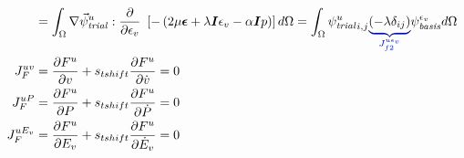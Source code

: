 \begin{align}
                                                                                                                                    & = \int_{\Omega} \nabla \trialvec[u] : \frac{\partial}{\partial \epsilon_{v}} \
    \left[-\left(2 \mu \tensor{\epsilon} + \lambda \tensor{I} \epsilon_{v} - \alpha \tensor{I} p \right) \right] d\Omega =
    \int_{\Omega} \trialscalar[u]_{i,j} \eqnannotate{\left(-\lambda \delta_{ij} \right)}{J_{f2}^{u \epsilon_{v}}} \basisscalar[\epsilon_{v}] d\Omega                                                                                                                                  \\
    J_F^{uv}                                                                                                                        & = \frac{\partial F^u}{\partial v} + s_{tshift} \frac{\partial F^u}{\partial \dot{v}} = 0                                                        \\
    J_F^{u P}                                                                                                                       & = \frac{\partial F^u}{\partial P} + s_{tshift} \frac{\partial F^u}{\partial \dot{P}} = 0                                                        \\
    J_F^{u E_{v}}                                                                                                                   & = \frac{\partial F^u}{\partial E_{v}} + s_{tshift} \frac{\partial F^u}{\partial \dot{E}_{v}} = 0
\end{align}

